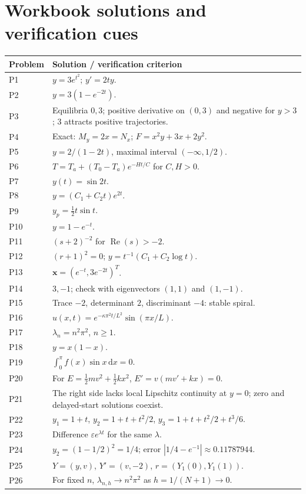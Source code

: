 \documentclass[11pt,letterpaper,oneside]{report}
\theoremstyle{definition}\newtheorem{definition}[theorem]{Definition}
\theoremstyle{remark}\newtheorem{remark}[theorem]{Remark}
\newcommand{\dd}{\,\mathrm{d}}
\begin{document}
\chapter{Workbook solutions and verification cues}
\small
\begin{longtable}{p{}p{}}
\toprule Problem & Solution / verification criterion \\ \midrule\endhead
P1 & $y=3e^{t^2}$; $y'=2ty$. \\
P2 & $y=3(1-e^{-2t})$. \\
P3 & Equilibria $0,3$; positive derivative on $(0,3)$ and negative for $y>3$; $3$ attracts positive trajectories. \\
P4 & Exact: $M_y=2x=N_x$; $F=x^2y+3x+2y^2$. \\
P5 & $y=2/(1-2t)$, maximal interval $(-\infty,1/2)$. \\
P6 & $T=T_a+(T_0-T_a)e^{-Ht/C}$ for $C,H>0$. \\
P7 & $y(t)=\sin2t$. \\
P8 & $y=(C_1+C_2t)e^{2t}$. \\
P9 & $y_p=\tfrac12 t\sin t$. \\
P10 & $y=1-e^{-t}$. \\
P11 & $(s+2)^{-2}$ for $\operatorname{Re}(s)>-2$. \\
P12 & $(r+1)^2=0$; $y=t^{-1}(C_1+C_2\log t)$. \\
P13 & $\mathbf x=(e^{-t},3e^{-2t})^T$. \\
P14 & $3,-1$; check with eigenvectors $(1,1)$ and $(1,-1)$. \\
P15 & Trace $-2$, determinant $2$, discriminant $-4$: stable spiral. \\
P16 & $u(x,t)=e^{-\kappa\pi^2t/L^2}\sin(\pi x/L)$. \\
P17 & $\lambda_n=n^2\pi^2$, $n\ge1$. \\
P18 & $y=x(1-x)$. \\
P19 & $\int_0^\pi f(x)\sin x\dd x=0$. \\
P20 & For $E=\frac12mv^2+\frac12kx^2$, $E'=v(mv'+kx)=0$. \\
P21 & The right side lacks local Lipschitz continuity at $y=0$; zero and delayed-start solutions coexist. \\
P22 & $y_1=1+t$, $y_2=1+t+t^2/2$, $y_3=1+t+t^2/2+t^3/6$. \\
P23 & Difference $\varepsilon e^{\lambda t}$ for the same $\lambda$. \\
P24 & $y_2=(1-1/2)^2=1/4$; error $|1/4-e^{-1}|\approx0.11787944$. \\
P25 & $Y=(y,v)$, $Y'=(v,-2)$, $r=(Y_1(0),Y_1(1))$. \\
P26 & For fixed $n$, $\lambda_{n,h}\to n^2\pi^2$ as $h=1/(N+1)\to0$. \\
\bottomrule
\end{longtable}
\normalsize
\end{document}
